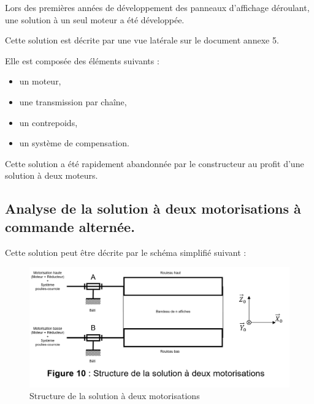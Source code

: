 Lors des premières années de développement des panneaux d'affichage déroulant, une solution à un seul moteur a été développée.

Cette solution est décrite par une vue latérale sur le document annexe 5.

Elle est composée des éléments suivants :
\begin{itemize}
 \item un moteur,
 \item une transmission par chaîne,
 \item un contrepoids,
 \item un système de compensation.
\end{itemize}



\newpage

Cette solution a été rapidement abandonnée par le constructeur au profit d'une solution à deux moteurs.


\subsection{Analyse de la solution à deux motorisations à commande alternée.}

Cette solution peut être décrite par le schéma simplifié suivant :

\begin{figure}[!h]
\begin{center}
	\includegraphics[width=0.8\linewidth]{img/fig10}
\end{center}
	\caption{Structure de la solution à deux motorisations}
	\label{fig10}
\end{figure}

